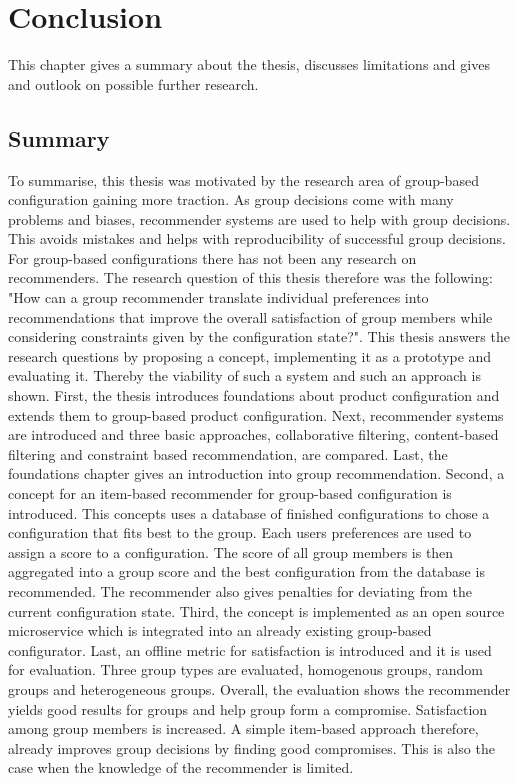 \chapter{Conclusion}
\label{ch:Conclusion}

This chapter gives a summary about the thesis, discusses limitations and gives and outlook on possible further research.

\section{Summary}
\label{sec:Conclusion:Summary}


To summarise, this thesis was motivated by the research area of group-based configuration gaining more traction. As group decisions come with many problems and biases, recommender systems are used  to help with group decisions. This avoids mistakes and helps with reproducibility of successful group decisions. For group-based configurations there has not been any research on recommenders. The research question of this thesis therefore was the following: "How can a group recommender translate individual preferences into recommendations that improve the overall satisfaction of group members while considering constraints given by the configuration state?". This thesis answers the research questions by proposing a concept, implementing it as a prototype and evaluating it. Thereby the viability of such a system and such an approach is shown.
First, the thesis introduces foundations about product configuration and extends them to group-based product configuration. Next, recommender systems are introduced and three basic approaches, collaborative filtering, content-based filtering and constraint based recommendation, are compared. Last, the foundations chapter gives an introduction into group recommendation.
Second, a concept for an item-based recommender for group-based configuration is introduced. This concepts uses a database of finished configurations to chose a configuration that fits best to the group. Each users preferences are used to assign a score to a configuration. The score of all group members is then aggregated into a group score and the best configuration from the database is recommended. The recommender also gives penalties for deviating from the current configuration state.
Third, the concept is implemented as an open source microservice which is integrated into an already existing group-based configurator.
Last, an offline metric for satisfaction is introduced and it is used for evaluation. Three group types are evaluated, homogenous groups, random groups and heterogeneous groups. Overall, the evaluation shows the recommender yields good results for groups and help group form a compromise. Satisfaction among group members is increased. A simple item-based approach therefore,  already improves group decisions by finding good compromises. This is also the case when the knowledge of the recommender is limited.

